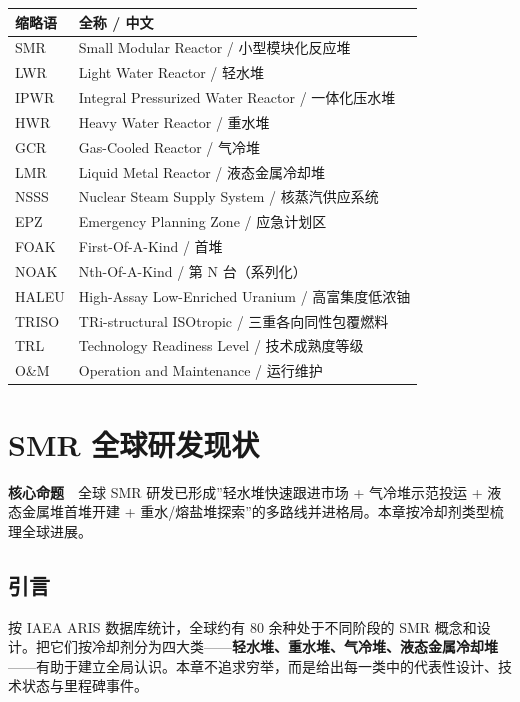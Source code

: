\documentclass[
  UTF8,
  scheme=plain,
  fontsize=10pt,
  openany
]{ctexbook}
\begin{document}
{\def\LTcaptype{none} %
\begin{longtable}[]{@{}ll@{}}
\toprule\noalign{}
缩略语 & 全称 / 中文 \\
\midrule\noalign{}
\endhead
\bottomrule\noalign{}
\endlastfoot
SMR & Small Modular Reactor / 小型模块化反应堆 \\
LWR & Light Water Reactor / 轻水堆 \\
IPWR & Integral Pressurized Water Reactor / 一体化压水堆 \\
HWR & Heavy Water Reactor / 重水堆 \\
GCR & Gas-Cooled Reactor / 气冷堆 \\
LMR & Liquid Metal Reactor / 液态金属冷却堆 \\
NSSS & Nuclear Steam Supply System / 核蒸汽供应系统 \\
EPZ & Emergency Planning Zone / 应急计划区 \\
FOAK & First-Of-A-Kind / 首堆 \\
NOAK & Nth-Of-A-Kind / 第 N 台（系列化） \\
HALEU & High-Assay Low-Enriched Uranium / 高富集度低浓铀 \\
TRISO & TRi-structural ISOtropic / 三重各向同性包覆燃料 \\
TRL & Technology Readiness Level / 技术成熟度等级 \\
O\&M & Operation and Maintenance / 运行维护 \\
\end{longtable}
}

\cleardoublepage

\chapter{SMR
全球研发现状}\label{smr-ux5168ux7403ux7814ux53d1ux73b0ux72b6}

\begin{epigraph}

\textbf{核心命题}　全球 SMR 研发已形成''轻水堆快速跟进市场 +
气冷堆示范投运 + 液态金属堆首堆开建 +
重水/熔盐堆探索''的多路线并进格局。本章按冷却剂类型梳理全球进展。

\end{epigraph}

\section{引言}\label{ux5f15ux8a00-1}

按 IAEA ARIS 数据库统计，全球约有 80 余种处于不同阶段的 SMR
概念和设计。把它们按冷却剂分为四大类------\textbf{轻水堆、重水堆、气冷堆、液态金属冷却堆}------有助于建立全局认识。本章不追求穷举，而是给出每一类中的代表性设计、技术状态与里程碑事件。
\end{document}
